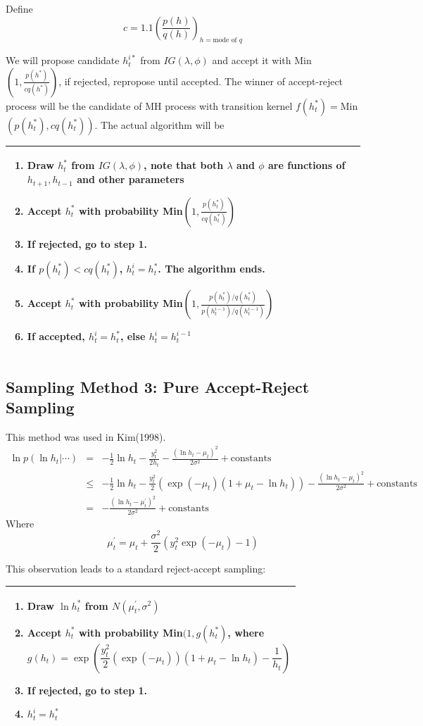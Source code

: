 \documentclass{article}
\begin{document}
Define
\[
c=1.1\left(\frac{p(h)}{q(h)}\right)_{h=\textrm{mode of } q}
\]

We will propose candidate $h^{i*}_t$ from $IG(\lambda,\phi)$ and accept it with Min$(1,\frac{p(h^*)}{cq(h^*)})$, if rejected, repropose until accepted. The winner of accept-reject process will be the candidate of MH process with transition kernel $f(h_t^*)=$Min$(p(h_t^*),cq(h_t^*))$. The actual algorithm will be

\begin{tabular}{|p{11cm}|}
\hline
\begin{enumerate}
\item
Draw $ h^*_t$ from $IG(\lambda,\phi)$, note that both $\lambda$ and $\phi$ are functions of $h_{t+1},h_{t-1}$ and other parameters
\item
Accept $h^*_t$ with probability Min$(1,\frac{p(h^*_t)}{cq(h^*_t)})$
\item
If rejected, go to step 1.
\item
If $p(h^*_t)<cq(h^*_t)$, $h^i_t=h^*_t$. The algorithm ends.
\item
Accept $h^*_t$ with probability Min$(1,\frac{p(h^*_t)/q(h^*_t)}{p(h^{i-1}_t)/q(h^{i-1}_t)})$
\item
If accepted,  $h^i_t=h^*_t$, else $h^i_t=h^{i-1}_t$
\end{enumerate}\\
\hline
\end{tabular}
\subsection{Sampling Method 3: Pure Accept-Reject Sampling}
This method was used in Kim(1998).
\begin{eqnarray}
\ln{p(\ln h_t|\cdots)}&=&-\frac{1}{2}\ln h_t-\frac{y_t^2}{2h_t}-\frac{(\ln h_t-\mu_t)^2}{2\sigma^2}+\textrm{constants}\nonumber\\
&\leq&-\frac{1}{2}\ln h_t-\frac{y_t^2}{2}\left(\exp(-\mu_t)(1+\mu_t-\ln h_t)\right)-\frac{(\ln h_t-\mu_t)^2}{2\sigma^2}+\textrm{constants}\nonumber\\
&=&-\frac{(\ln h_t-\mu^\prime_t)^2}{2\sigma^2}+\textrm{constants}
\end{eqnarray}
Where
\[
\mu^\prime_t=\mu_t+\frac{\sigma^2}{2}(y_t^2\exp(-\mu_t)-1)
\]

This observation leads to a standard reject-accept sampling:

\begin{tabular}{|p{11cm}|}
\hline
\begin{enumerate}
\item
Draw $\ln h^*_t$ from $N(\mu^\prime_t,\sigma^2)$
\item
Accept $h^*_t$ with probability Min$(1,g(h^*_t)$, where
\[
g(h_t)=\exp(\frac{y_t^2}{2}(\exp(-\mu_t))(1+\mu_t-\ln h_t)-\frac{1}{h_t})
\]
\item
If rejected, go to step 1.
\item
$h^i_t=h^*_t$
\end{enumerate}\\
\hline
\end{tabular}
\end{document}
